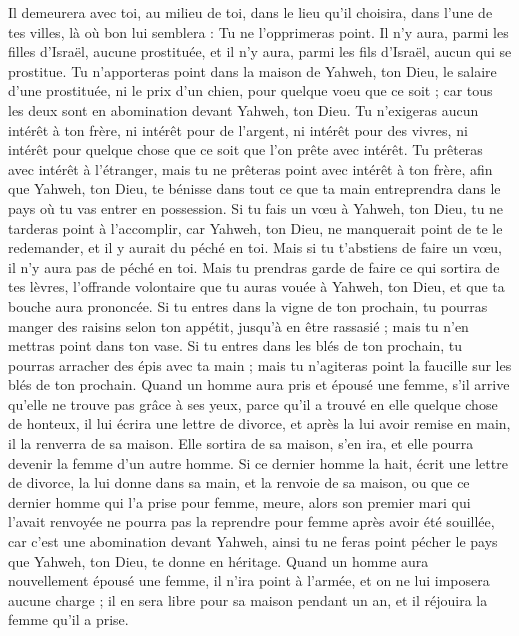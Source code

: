 \begin{multicols}{2}
Il demeurera avec toi, au milieu de toi, dans le lieu qu'il choisira, dans l'une de tes villes, là où bon lui semblera : Tu ne l'opprimeras point.
Il n'y aura, parmi les filles d'Israël, aucune prostituée, et il n'y aura, parmi les fils d'Israël, aucun qui se prostitue.
Tu n'apporteras point dans la maison de Yahweh, ton Dieu, le salaire d'une prostituée, ni le prix d'un chien, pour quelque voeu que ce soit ; car tous les deux sont en abomination devant Yahweh, ton Dieu.
Tu n'exigeras aucun intérêt à ton frère, ni intérêt pour de l'argent, ni intérêt pour des vivres, ni intérêt pour quelque chose que ce soit que l'on prête avec intérêt.
Tu prêteras avec intérêt à l'étranger, mais tu ne prêteras point avec intérêt à ton frère, afin que Yahweh, ton Dieu, te bénisse dans tout ce que ta main entreprendra dans le pays où tu vas entrer en possession.
Si tu fais un vœu à Yahweh, ton Dieu, tu ne tarderas point à l'accomplir, car Yahweh, ton Dieu, ne manquerait point de te le redemander, et il y aurait du péché en toi.
Mais si tu t'abstiens de faire un vœu, il n'y aura pas de péché en toi.
Mais tu prendras garde de faire ce qui sortira de tes lèvres, l'offrande volontaire que tu auras vouée à Yahweh, ton Dieu, et que ta bouche aura prononcée.
Si tu entres dans la vigne de ton prochain, tu pourras manger des raisins selon ton appétit, jusqu'à en être rassasié ; mais tu n'en mettras point dans ton vase.
Si tu entres dans les blés de ton prochain, tu pourras arracher des épis avec ta main ; mais tu n'agiteras point la faucille sur les blés de ton prochain.
\VerseOne{}Quand un homme aura pris et épousé une femme, s'il arrive qu'elle ne trouve pas grâce à ses yeux, parce qu'il a trouvé en elle quelque chose de honteux, il lui écrira une lettre de divorce, et après la lui avoir remise en main, il la renverra de sa maison.
Elle sortira de sa maison, s'en ira, et elle pourra devenir la femme d'un autre homme.
Si ce dernier homme la hait, écrit une lettre de divorce, la lui donne dans sa main, et la renvoie de sa maison, ou que ce dernier homme qui l'a prise pour femme, meure,
alors son premier mari qui l'avait renvoyée ne pourra pas la reprendre pour femme après avoir été souillée, car c'est une abomination devant Yahweh, ainsi tu ne feras point pécher le pays que Yahweh, ton Dieu, te donne en héritage.
Quand un homme aura nouvellement épousé une femme, il n'ira point à l'armée, et on ne lui imposera aucune charge ; il en sera libre pour sa maison pendant un an, et il réjouira la femme qu'il a prise.

\end{multicols}
